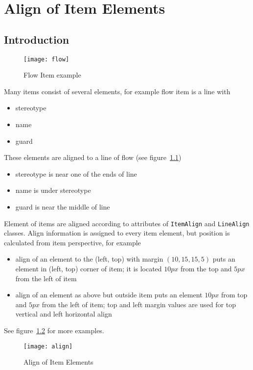 \documentclass[draft]{book}
\newcommand{\rclass}[1]{\texttt{#1}}
\begin{document}
\chapter{Align of Item Elements}
\section{Introduction}
\begin{figure}
\begin{center}
\texttt{[image: flow]}
\end{center}
\caption{Flow Item example}\label{items:example:flow}
\end{figure}

Many items consist of several elements, for example flow item is a line
with
\begin{itemize}
\item stereotype
\item name
\item guard
\end{itemize}
These elements are aligned to a line of flow (see
figure~\ref{items:example:flow})
\begin{itemize}
\item stereotype is near one of the ends of line
\item name is under stereotype
\item guard is near the middle of line
\end{itemize}

Element of items are aligned according to attributes of
\rclass{ItemAlign} and \rclass{LineAlign} classes. Align information is
assigned to every item element, but position is calculated from item
perspective, for example
\begin{itemize}
\item align of an element to the (left, top) with margin $(10, 15, 15, 5)$
puts an element in (left, top) corner of item; it is located $10px$ from the top
and $5px$ from the left of item
\item align of an element as above but outside item puts an element $10px$
from top and $5px$ from the left of item; top and left margin values are
used for top vertical and left horizontal align
\end{itemize}
See figure~\ref{items:align} for more examples.

\begin{figure}
\begin{center}
\texttt{[image: align]}
\end{center}
\caption{Align of Item Elements}\label{items:align}
\end{figure}
\end{document}
